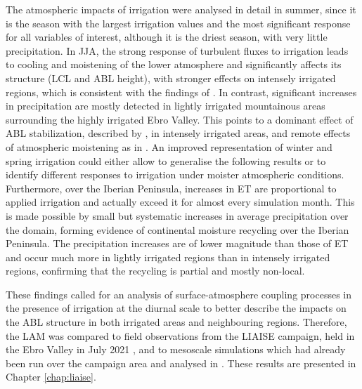 The atmospheric impacts of irrigation were analysed in detail in summer, since it is the season with the largest irrigation values and the most significant response for all variables of interest, although it is the driest season, with very little precipitation. 
In JJA, the strong response of turbulent fluxes to irrigation leads to cooling and moistening of the lower atmosphere and significantly affects its structure (LCL and ABL height), with stronger effects on intensely irrigated regions, which is consistent with the findings of \citet{rappin_landatmosphere_2022}. In contrast, significant increases in precipitation are mostly detected in lightly irrigated mountainous areas surrounding the highly irrigated Ebro Valley. This points to a dominant effect of ABL stabilization, described by \citet{findell_atmospheric_2003-1, ek_influence_2004}, in intensely irrigated areas, and remote effects of atmospheric moistening as in \citet{deangelis_evidence_2010, lo_irrigation_2013, yang_impact_2017}. 
An improved representation of winter and spring irrigation could either allow to generalise the following results or to identify different responses to irrigation under moister atmospheric conditions.
Furthermore, over the Iberian Peninsula, increases in ET are proportional to applied irrigation and actually exceed it for almost every simulation month. This is made possible by small but systematic increases in average precipitation over the domain, forming evidence of continental moisture recycling over the Iberian Peninsula. The precipitation increases are of lower magnitude than those of ET and occur much more in lightly irrigated regions than in intensely irrigated regions, confirming that the recycling is partial and mostly non-local.

These findings called for an analysis of surface-atmosphere coupling processes in the presence of irrigation at the diurnal scale to better describe the impacts on the ABL structure in both irrigated areas and neighbouring regions.
Therefore, the LAM was compared to field observations from the LIAISE campaign, held in the Ebro Valley in July 2021 \citep{boone_land_2025}, and to mesoscale simulations which had already been run over the campaign area and analysed in \citet{lunel_irrigation_2024,lunel_marinada_2024}. These results are presented in Chapter \ref{chap:liaise}.


